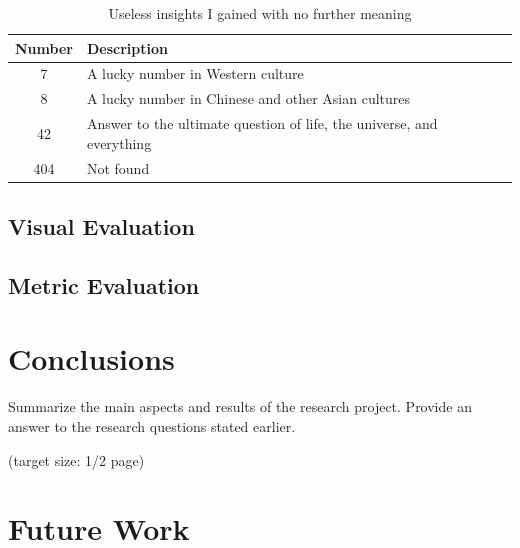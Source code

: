 \documentclass[a4paper,11pt,oneside]{article}
\begin{document}
  \begin{table}[ht]
    \begin{center}
      \begin{tabular}{cl}
        \toprule
        Number & Description \\
        \midrule
        7 & A lucky number in Western culture \\
        8 & A lucky number in Chinese and other Asian cultures \\
        42 & Answer to the ultimate question of life, the universe, and everything \\
        404 & Not found \\
        \bottomrule
      \end{tabular}
      \caption{Useless insights I gained with no further meaning}
    \end{center}
  \end{table}

  \subsection{Visual Evaluation}
  \subsection{Metric Evaluation}

  \section{Conclusions}

  Summarize the main aspects and results of the research
  project. Provide an answer to the research questions stated earlier.

  (target size: 1/2 page)

  \section{Future Work}

  \newpage

  \printbibliography
\end{document}
